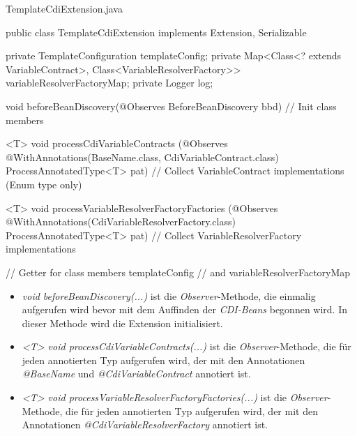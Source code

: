 \begin{program}[h]
\caption{TemplateCdiExtension.java}
\label{prog:templateCdiExtension}
\begin{JavaCode}
public class TemplateCdiExtension implements Extension,
        Serializable {

    private TemplateConfiguration templateConfig;
    private Map<Class<? extends VariableContract>, 
                Class<VariableResolverFactory>>  
            variableResolverFactoryMap;
    private Logger log;

    void beforeBeanDiscovery(@Observes BeforeBeanDiscovery bbd) {
        // Init class members
    }

    <T> void processCdiVariableContracts
             (@Observes @WithAnnotations({BaseName.class, 
                                          CdiVariableContract.class}) 
             ProcessAnnotatedType<T> pat) {
       // Collect VariableContract implementations (Enum type only)
    }

    <T> void processVariableResolverFactoryFactories
        (@Observes @WithAnnotations(CdiVariableResolverFactory.class) 
        ProcessAnnotatedType<T> pat) {
        // Collect VariableResolverFactory implementations
    }

    // Getter for class members templateConfig
    // and variableResolverFactoryMap
}
\end{JavaCode}
\end{program}
\begin{itemize}
	\item\emph{void beforeBeanDiscovery(...)} 
	\newline
	ist die \emph{Observer}-Methode, die einmalig aufgerufen wird bevor mit dem Auffinden der \emph{CDI-Beans} begonnen wird. In dieser Methode wird die Extension initialisiert.
	\item\emph{<T> void processCdiVariableContracts(...)} 
	\newline
	ist die \emph{Observer}-Methode, die für jeden annotierten Typ aufgerufen wird, der mit den Annotationen \emph{@BaseName} und \emph{@CdiVariableContract} annotiert ist.
	\item\emph{<T> void processVariableResolverFactoryFactories(...)} 
	\newline
	ist die \emph{Observer}-Methode, die für jeden annotierten Typ aufgerufen wird, der mit den Annotationen \emph{@CdiVariableResolverFactory} annotiert ist.
\end{itemize}
\ \newpage

